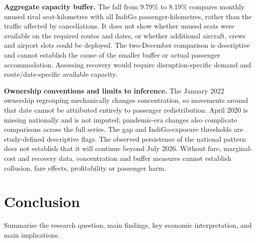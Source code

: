 \documentclass[12pt,a4paper]{article}
\begin{document}
\textbf{Aggregate capacity buffer.} The fall from 9.79\% to 8.19\% compares monthly unused rival seat-kilometres with all IndiGo passenger-kilometres, rather than the traffic affected by cancellations. It does not show whether unused seats were available on the required routes and dates, or whether additional aircraft, crews and airport slots could be deployed. The two-December comparison is descriptive and cannot establish the cause of the smaller buffer or actual passenger accommodation. Assessing recovery would require disruption-specific demand and route/date-specific available capacity.

\textbf{Ownership conventions and limits to inference.} The January 2022 ownership regrouping mechanically changes concentration, so movements around that date cannot be attributed entirely to passenger redistribution. April 2020 is missing nationally and is not imputed; pandemic-era changes also complicate comparisons across the full series. The gap and IndiGo-exposure thresholds are study-defined descriptive flags. The observed persistence of the national pattern does not establish that it will continue beyond July 2026. Without fare, marginal-cost and recovery data, concentration and buffer measures cannot establish collusion, fare effects, profitability or passenger harm.


\section{Conclusion}
Summarise the research question, main findings, key economic interpretation, and main implications.

\newpage
\nocite{kubicek2026aviationstats,dgcaDomesticSchedules}
\printbibliography[title={References}]

\newpage
\appendix
\end{document}
